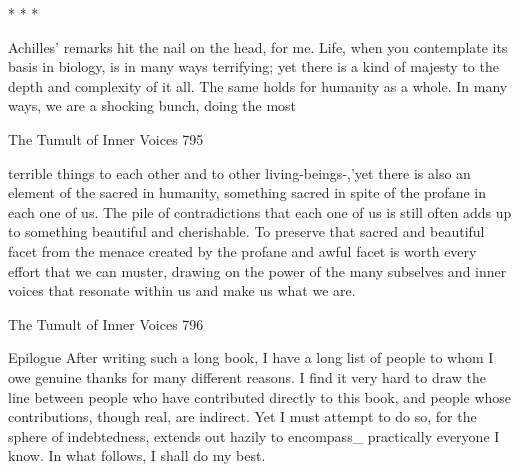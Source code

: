                                          *       *       *

        Achilles' remarks hit the nail on the head, for me. Life, when you contemplate
its basis in biology, is in many ways terrifying; yet there is a kind of majesty to the
depth and complexity of it all. The same holds for humanity as a whole. In many
ways, we are a shocking bunch, doing the most




The Tumult of Inner Voices                                                             795

terrible things to each other and to other living-beings-,'yet there is also an element of
the sacred in humanity, something sacred in spite of the profane in each one of us.
        The pile of contradictions that each one of us is still often adds up to
something beautiful and cherishable. To preserve that sacred and beautiful facet from
the menace created by the profane and awful facet is worth every effort that we can
muster, drawing on the power of the many subselves and inner voices that resonate
within us and make us what we are.




The Tumult of Inner Voices                                                            796

                                      Epilogue
        After writing such a long book, I have a long list of people to whom I owe
genuine thanks for many different reasons. I find it very hard to draw the line between
people who have contributed directly to this book, and people whose contributions,
though real, are indirect. Yet I must attempt to do so, for the sphere of indebtedness,
extends out hazily to encompass\_ practically everyone I know. In what follows, I
shall do my best.

